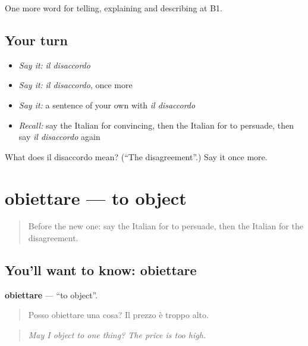 \begin{grammarlens}[title={What you've built}]
One more word for telling, explaining and describing at B1.
\end{grammarlens}

\subsection*{Your turn}
\begin{itemize}
\raggedright
  \item \emph{Say it:} \emph{il disaccordo}
  \item \emph{Say it:} \emph{il disaccordo}, once more
  \item \emph{Say it:} a sentence of your own with \emph{il disaccordo}
  \item \emph{Recall:} say the Italian for convincing, then the Italian for to persuade, then say \emph{il disaccordo} again
\end{itemize}

\begin{tcolorbox}[breakable,colback=teal!4,colframe=teal!35!black,title={Before you move on}]
What does il disaccordo mean? (\textquotedblleft{}The disagreement\textquotedblright{}.) Say it once more.
\end{tcolorbox}
\section[obiettare]{obiettare — to object}

\label{lesson:IT-C341-obiettare}



\begin{quote}
Before the new one: say the Italian for to persuade, then the Italian for the disagreement.
\end{quote}

\subsection*{You'll want to know: obiettare}
\textbf{obiettare} — \textquotedblleft{}to object\textquotedblright{}.

\begin{quote}
Posso obiettare una cosa? Il prezzo è troppo alto.
\end{quote}

\begin{quote}
\emph{May I object to one thing? The price is too high.}
\end{quote}

